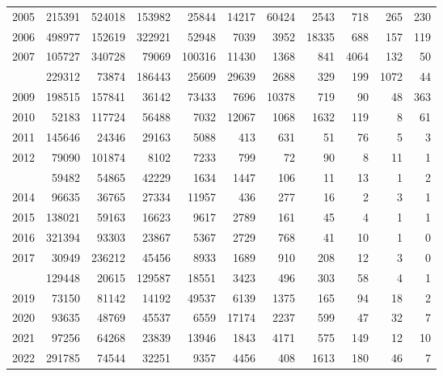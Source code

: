 \documentclass[
]{article}
\begin{document}
\begin{longtable}[t]{lrrrrrrrrrr}
2005 & 215391 & 524018 & 153982 & 25844 & 14217 & 60424 & 2543 & 718 & 265 & 230\\
2006 & 498977 & 152619 & 322921 & 52948 & 7039 & 3952 & 18335 & 688 & 157 & 119\\
2007 & 105727 & 340728 & 79069 & 100316 & 11430 & 1368 & 841 & 4064 & 132 & 50\\
\addlinespace
2008 & 229312 & 73874 & 186443 & 25609 & 29639 & 2688 & 329 & 199 & 1072 & 44\\
2009 & 198515 & 157841 & 36142 & 73433 & 7696 & 10378 & 719 & 90 & 48 & 363\\
2010 & 52183 & 117724 & 56488 & 7032 & 12067 & 1068 & 1632 & 119 & 8 & 61\\
2011 & 145646 & 24346 & 29163 & 5088 & 413 & 631 & 51 & 76 & 5 & 3\\
2012 & 79090 & 101874 & 8102 & 7233 & 799 & 72 & 90 & 8 & 11 & 1\\
\addlinespace
2013 & 59482 & 54865 & 42229 & 1634 & 1447 & 106 & 11 & 13 & 1 & 2\\
2014 & 96635 & 36765 & 27334 & 11957 & 436 & 277 & 16 & 2 & 3 & 1\\
2015 & 138021 & 59163 & 16623 & 9617 & 2789 & 161 & 45 & 4 & 1 & 1\\
2016 & 321394 & 93303 & 23867 & 5367 & 2729 & 768 & 41 & 10 & 1 & 0\\
2017 & 30949 & 236212 & 45456 & 8933 & 1689 & 910 & 208 & 12 & 3 & 0\\
\addlinespace
2018 & 129448 & 20615 & 129587 & 18551 & 3423 & 496 & 303 & 58 & 4 & 1\\
2019 & 73150 & 81142 & 14192 & 49537 & 6139 & 1375 & 165 & 94 & 18 & 2\\
2020 & 93635 & 48769 & 45537 & 6559 & 17174 & 2237 & 599 & 47 & 32 & 7\\
2021 & 97256 & 64268 & 23839 & 13946 & 1843 & 4171 & 575 & 149 & 12 & 10\\
2022 & 291785 & 74544 & 32251 & 9357 & 4456 & 408 & 1613 & 180 & 46 & 7\\*
\end{longtable}
\end{document}
